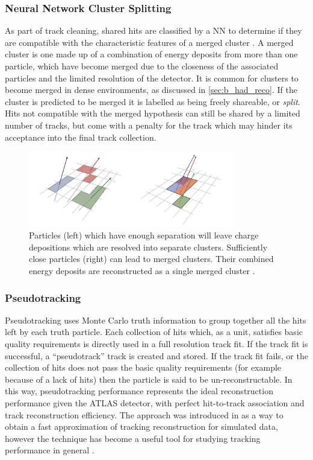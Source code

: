 \subsubsection{Neural Network Cluster Splitting}
As part of track cleaning, shared hits are classified by a NN to determine if they are compatible with the characteristic features of a merged cluster \cite{PERF-2012-05, ATL-PHYS-PUB-2015-006}.
A merged cluster is one made up of a combination of energy deposits from more than one particle, which have become merged due to the closeness of the associated particles and the limited resolution of the detector.
It is common for clusters to become merged in dense environments, as discussed in \cref{sec:b_had_reco}.
If the cluster is predicted to be merged it is labelled as being freely shareable, or \textit{split}.
Hits not compatible with the merged hypothesis can still be shared by a limited number of tracks, but come with a penalty for the track which may hinder its acceptance into the final track collection.
%
\begin{figure}[ht]
    \centering
    \includegraphics[width=0.8\textwidth]{chapters/2.detector/figs/merged-cluster.png}
    \caption{
      Particles (left) which have enough separation will leave charge depositions which are resolved into separate clusters.
      Sufficiently close particles (right) can lead to merged clusters.
      Their combined energy deposits are reconstructed as a single merged cluster \cite{PERF-2015-08}.}
    \label{fig:resolved/merged clusters}
\end{figure}
%

\subsubsection{Pseudotracking}\label{sec:pseudotracks}

Pseudotracking uses Monte Carlo truth information to group together all the hits left by each truth particle.
Each collection of hits which, as a unit, satisfies basic quality requirements is directly used in a full resolution track fit.
If the track fit is successful, a ``pseudotrack'' track is created and stored.
If the track fit fails, or the collection of hits does not pass the basic quality requirements (for example because of a lack of hits) then the particle is said to be un-reconstructable.
In this way, pseudotracking performance represents the ideal reconstruction performance given the ATLAS detector, with perfect hit-to-track association and track reconstruction efficiency.
The approach was introduced in  as a way to obtain a fast approximation of tracking reconstruction for simulated data, however the technique has become a useful tool for studying tracking performance in general \cite{ATL-PHYS-PUB-2015-006}.


